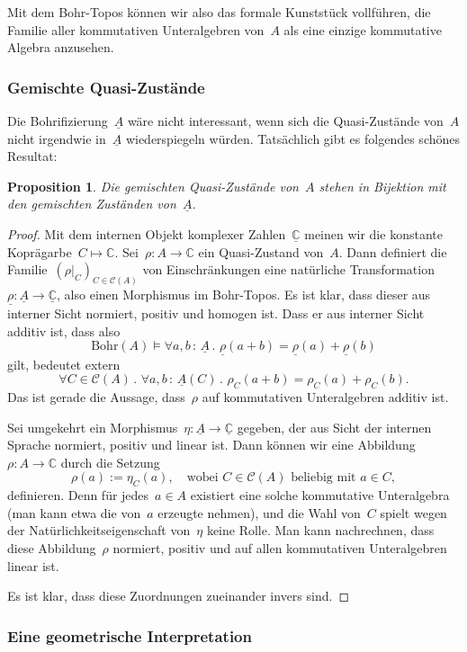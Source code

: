\documentclass[a4paper,ngerman,12pt]{scrartcl}
\theoremstyle{definition}
\theoremstyle{plain}
\newtheorem{prop}[defn]{Proposition}
\theoremstyle{remark}
\newcommand{\CC}{\mathbb{C}}
\newcommand{\C}{\mathcal{C}}
\newcommand{\Bohr}{\mathrm{Bohr}}
\newcommand{\ul}[1]{\underline{#1}}
\renewcommand{\_}{\mathpunct{.}\,}
\newcommand{\?}{\,{:}\,}
\begin{document}
Mit dem Bohr-Topos können wir also das formale Kunststück vollführen, die
Familie aller kommutativen Unteralgebren von~$A$ als eine einzige kommutative
Algebra anzusehen.


\subsubsection*{Gemischte Quasi-Zustände}

Die Bohrifizierung~$\ul{A}$ wäre nicht interessant, wenn sich die Quasi-Zustände
von~$A$ nicht irgendwie in~$\ul{A}$ wiederspiegeln würden. Tatsächlich gibt es
folgendes schönes Resultat:

\begin{prop}Die gemischten Quasi-Zustände von~$A$ stehen in Bijektion mit den
gemischten Zuständen von~$\ul{A}$.\end{prop}
\begin{proof}Mit dem internen Objekt komplexer Zahlen~$\ul{\CC}$ meinen wir die
konstante Koprägarbe~$C \mapsto \CC$. Sei~$\rho : A \to \CC$ ein Quasi-Zustand
von~$A$. Dann definiert die Familie~$(\rho|_C)_{C \in \C(A)}$ von
Einschränkungen eine natürliche Transformation~$\ul{\rho} : \ul{A} \to
\ul{\CC}$, also einen Morphismus im Bohr-Topos. Es ist klar, dass dieser aus
interner Sicht normiert, positiv und homogen ist. Dass er aus interner Sicht
additiv ist, dass also
\[ \Bohr(A) \models \forall a,b\?\ul{A}\_ \ul{\rho}(a+b) = \ul{\rho}(a) +
\ul{\rho}(b) \]
gilt, bedeutet extern
\[ \forall C \in \C(A)\_ \forall a,b\?\ul{A}(C)\_ \rho_C(a+b) = \rho_C(a) +
\rho_C(b). \]
Das ist gerade die Aussage, dass~$\rho$ auf kommutativen Unteralgebren additiv
ist.

Sei umgekehrt ein Morphismus~$\eta : \ul{A} \to \ul{\CC}$ gegeben, der aus
Sicht der internen Sprache normiert, positiv und linear ist. Dann können wir
eine Abbildung~$\rho : A \to \CC$ durch die Setzung
\[ \rho(a) := \eta_C(a), \quad\text{wobei~$C \in \C(A)$ beliebig mit~$a \in
C$}, \]
definieren. Denn für jedes~$a \in A$ existiert eine solche kommutative Unteralgebra (man kann
etwa die von~$a$ erzeugte nehmen), und die Wahl von~$C$ spielt wegen der
Natürlichkeitseigenschaft von~$\eta$ keine Rolle. Man kann nachrechnen, dass
diese Abbildung~$\rho$ normiert, positiv und auf allen kommutativen
Unteralgebren linear ist.

Es ist klar, dass diese Zuordnungen zueinander invers sind.\end{proof}


\subsubsection*{Eine geometrische Interpretation}
\end{document}
